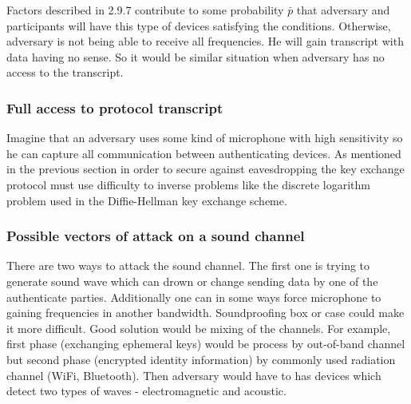 \documentclass[11pt,titlepage]{article}
\theoremstyle{plain}
\begin{document}
Factors described in 2.9.7 contribute to some probability $\bar{p}$ that adversary and participants will have this type of devices satisfying the conditions. Otherwise, adversary is not being able to receive all frequencies. He will gain transcript with data having no sense. So it would be similar situation when adversary has no access to the transcript.  


\subsubsection{Full access to protocol transcript}
Imagine that an adversary uses some kind of microphone with high sensitivity so he can capture all communication between authenticating devices. As mentioned in the previous section in order to secure against eavesdropping the key exchange protocol must use difficulty to inverse problems like the discrete logarithm problem used in the Diffie-Hellman key exchange scheme.

\subsubsection{Possible vectors of attack on a sound channel}
There are two ways to attack the sound channel. The first one is trying to generate sound wave which can drown or change sending data by one of the authenticate parties. Additionally one can in some ways force microphone to gaining frequencies in another bandwidth. Soundproofing box or case could make it more difficult. %
Good solution would be mixing of the channels. For example, first phase (exchanging ephemeral keys) would be process by out-of-band channel but second phase (encrypted identity information) by commonly used radiation channel (WiFi, Bluetooth). Then adversary would have to has devices which detect two types of waves - electromagnetic and acoustic.
\end{document}
